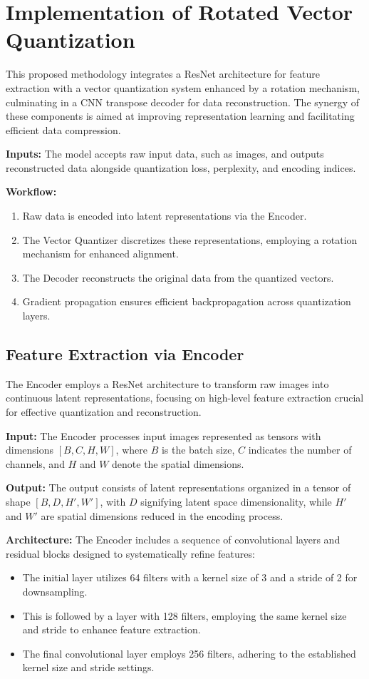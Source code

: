 \section{Implementation of Rotated Vector Quantization}

This proposed methodology integrates a ResNet architecture for feature extraction with a vector quantization system enhanced by a rotation mechanism, culminating in a CNN transpose decoder for data reconstruction. The synergy of these components is aimed at improving representation learning and facilitating efficient data compression.

\textbf{Inputs:} The model accepts raw input data, such as images, and outputs reconstructed data alongside quantization loss, perplexity, and encoding indices.

\textbf{Workflow:}
\begin{enumerate}
    \item Raw data is encoded into latent representations via the Encoder.
    \item The Vector Quantizer discretizes these representations, employing a rotation mechanism for enhanced alignment.
    \item The Decoder reconstructs the original data from the quantized vectors.
    \item Gradient propagation ensures efficient backpropagation across quantization layers.
\end{enumerate}

\subsection{Feature Extraction via Encoder}
The Encoder employs a ResNet architecture to transform raw images into continuous latent representations, focusing on high-level feature extraction crucial for effective quantization and reconstruction.

\textbf{Input:} The Encoder processes input images represented as tensors with dimensions \([B, C, H, W]\), where \(B\) is the batch size, \(C\) indicates the number of channels, and \(H\) and \(W\) denote the spatial dimensions.

\textbf{Output:} The output consists of latent representations organized in a tensor of shape \([B, D, H', W']\), with \(D\) signifying latent space dimensionality, while \(H'\) and \(W'\) are spatial dimensions reduced in the encoding process.

\textbf{Architecture:} The Encoder includes a sequence of convolutional layers and residual blocks designed to systematically refine features:
\begin{itemize}
    \item The initial layer utilizes 64 filters with a kernel size of 3 and a stride of 2 for downsampling.
    \item This is followed by a layer with 128 filters, employing the same kernel size and stride to enhance feature extraction.
    \item The final convolutional layer employs 256 filters, adhering to the established kernel size and stride settings.
\end{itemize}

